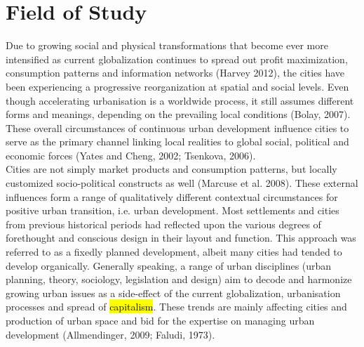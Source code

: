 \documentclass[11pt]{report}
\begin{document}
\section{Field of Study}
Due to growing social and physical transformations that become ever more intensified as current globalization continues to spread out profit maximization, consumption patterns and information networks (Harvey 2012), the cities have been experiencing a progressive reorganization at spatial and social levels. Even though accelerating urbanisation is a worldwide process, it still assumes different forms and meanings, depending on the prevailing local conditions (Bolay, 2007). These overall circumstances of continuous urban development influence cities to serve as the primary channel linking local realities to global social, political and economic forces (Yates and Cheng, 2002; Tsenkova, 2006).
\\
Cities are not simply market products and consumption patterns, but locally customized socio-political constructs as well (Marcuse et al. 2008). These external influences form a range of qualitatively different contextual circumstances for positive urban transition, i.e. urban development. Most settlements and cities from previous historical periods had reflected upon the various degrees of forethought and conscious design in their layout and function. This approach was referred to as a fixedly planned development, albeit many cities had tended to develop organically. Generally speaking, a range of urban disciplines (urban planning, theory, sociology, legislation and design) aim to decode and harmonize growing urban issues as a side-effect of the current globalization, urbanisation processes and spread of \hl{capitalism}. These trends are mainly affecting cities and production of urban space and bid for the expertise on managing urban development (Allmendinger, 2009; Faludi, 1973). 
\\
\end{document}
